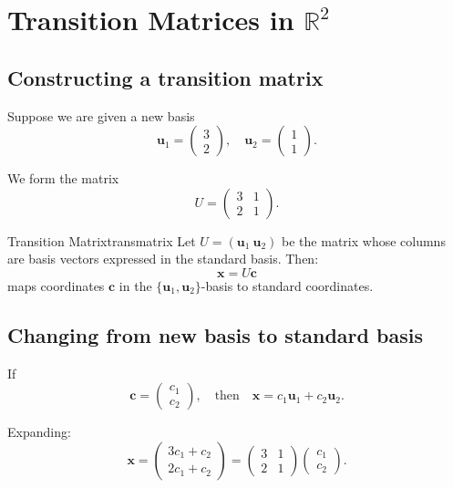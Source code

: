 \documentclass[12pt,a4paper]{article}
\newcommand{\R}{\mathbb{R}}
\newcommand{\vv}[1]{\mathbf{#1}}
\begin{document}
	\section{Transition Matrices in $\R^2$}
	
	\subsection{Constructing a transition matrix}
	
	Suppose we are given a new basis
	\[
	\vv{u}_1 = \begin{pmatrix}3 \\ 2\end{pmatrix}, \quad
	\vv{u}_2 = \begin{pmatrix}1 \\ 1\end{pmatrix}.
	\]
	
	We form the matrix
	\[
	U = \begin{pmatrix}
		3 & 1 \\
		2 & 1
	\end{pmatrix}.
	\]
	
	\begin{definition}{Transition Matrix}{transmatrix}
		Let $U = (\vv{u}_1 \ \vv{u}_2)$ be the matrix whose columns are basis vectors expressed in the standard basis. Then:
		\[
		\vv{x} = U\vv{c}
		\]
		maps coordinates $\vv{c}$ in the $\{\vv{u}_1,\vv{u}_2\}$-basis to standard coordinates.
	\end{definition}
	
	\subsection{Changing from new basis to standard basis}
	
	If
	\[
	\vv{c} =
	\begin{pmatrix}
		c_1 \\
		c_2
	\end{pmatrix},
	\quad \text{then} \quad
	\vv{x} = c_1 \vv{u}_1 + c_2 \vv{u}_2.
	\]
	
	Expanding:
	\[
	\vv{x} =
	\begin{pmatrix}
		3c_1 + c_2 \\
		2c_1 + c_2
	\end{pmatrix}
	=
	\begin{pmatrix}
		3 & 1 \\
		2 & 1
	\end{pmatrix}
	\begin{pmatrix}
		c_1 \\
		c_2
	\end{pmatrix}.
	\]
	
\end{document}
